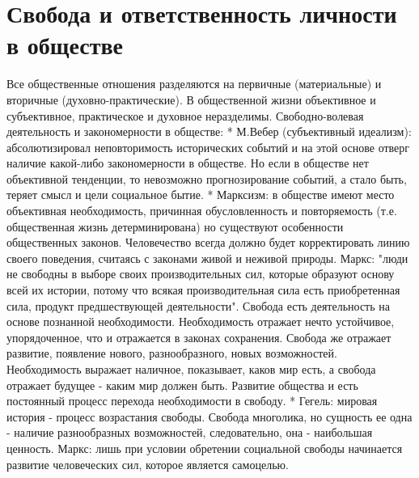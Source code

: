 \documentclass[12pt]{article}
\begin{document}
\section{Свобода и ответственность личности в обществе}
Все общественные отношения разделяются на первичные (материальные) и вторичные (духовно-практические).
В общественной жизни объективное и субъективное, практическое и духовное неразделимы.
Свободно-волевая деятельность и закономерности в обществе:
   * М.Вебер (субъективный идеализм): абсолютизировал неповторимость исторических событий и на этой
основе отверг наличие какой-либо закономерности в обществе. Но если в обществе нет объективной тенденции,
то невозможно прогнозирование событий, а стало быть, теряет смысл и цели социальное бытие.
    *  Марксизм:  в  обществе  имеют  место  объективная  необходимость,  причинная  обусловленность  и
повторяемость (т.е. общественная жизнь детерминирована) но существуют особенности общественных законов.
Человечество  всегда должно  будет корректировать  линию своего поведения, считаясь с законами  живой  и
неживой природы. Маркс: "люди не свободны в выборе своих производительных сил, которые образуют основу
всей их истории, потому что всякая производительная сила есть приобретенная сила, продукт предшествующей
деятельности". Свобода есть деятельность на основе познанной необходимости. Необходимость отражает нечто
устойчивое, упорядоченное, что и отражается в законах сохранения. Свобода же отражает развитие, появление
нового, разнообразного, новых возможностей. Необходимость выражает наличное, показывает, каков мир есть,
а свобода отражает будущее - каким мир должен быть. Развитие общества и есть постоянный процесс перехода
необходимости в свободу.
* Гегель: мировая история - процесс возрастания свободы. Свобода многолика, но сущность ее одна - наличие
разнообразных возможностей, следовательно, она - наибольшая ценность. Маркс: лишь при условии обретении
социальной свободы начинается развитие человеческих сил, которое является самоцелью.

\newpage
\end{document}

